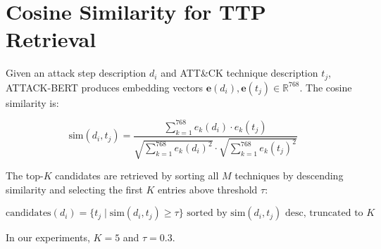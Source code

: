 \section{Cosine Similarity for TTP Retrieval}
\label{app:cosine}

Given an attack step description $d_i$ and ATT\&CK technique description $t_j$, ATTACK-BERT produces embedding vectors $\mathbf{e}(d_i), \mathbf{e}(t_j) \in \mathbb{R}^{768}$. The cosine similarity is:

\begin{equation}
\text{sim}(d_i, t_j) = \frac{\sum_{k=1}^{768} e_k(d_i) \cdot e_k(t_j)}{\sqrt{\sum_{k=1}^{768} e_k(d_i)^2} \cdot \sqrt{\sum_{k=1}^{768} e_k(t_j)^2}}
\end{equation}

The top-$K$ candidates are retrieved by sorting all $M$ techniques by descending similarity and selecting the first $K$ entries above threshold $\tau$:

\begin{equation}
\text{candidates}(d_i) = \{t_j \mid \text{sim}(d_i, t_j) \geq \tau\} \text{ sorted by } \text{sim}(d_i, t_j) \text{ desc, truncated to } K
\end{equation}

In our experiments, $K=5$ and $\tau=0.3$.
